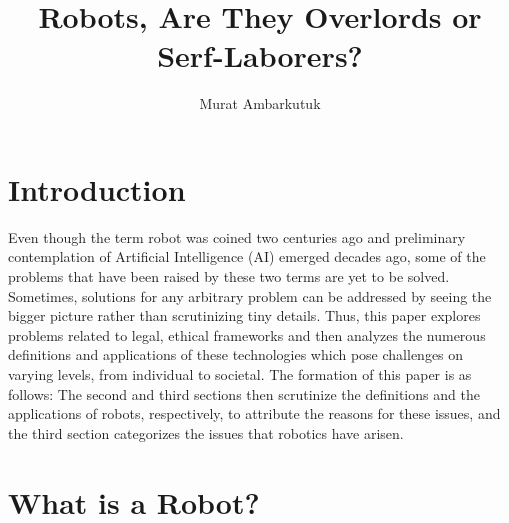 \documentclass[man]{apa6}
\title{Robots, Are They Overlords or Serf-Laborers?}
\author{Murat Ambarkutuk}
\affiliation{English Language Institute, University of Delaware \\ murata@udel.
edu}
\begin{document}
\maketitle

\section{Introduction}
Even though the term robot was coined two centuries ago and preliminary contemplation of Artificial Intelligence (AI) emerged decades ago, some of the problems that have been raised by these two terms are yet to be solved.
Sometimes, solutions for any arbitrary problem can be addressed by seeing the bigger picture rather than scrutinizing tiny details.
Thus, this paper explores problems related to legal, ethical frameworks and then analyzes the numerous definitions and applications of these technologies which pose challenges on varying levels, from individual to societal.
The formation of this paper is as follows: The second and third sections then scrutinize the definitions and the applications of robots, respectively, to attribute the reasons for these issues, and the third section categorizes the issues that robotics have arisen.

\section{What is a Robot?}
\par
\end{document}
